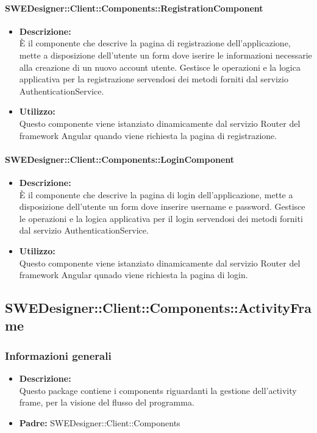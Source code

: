 			\paragraph{SWEDesigner::Client::Components::RegistrationComponent}
				\begin{itemize}
          			\item \textbf{Descrizione:}\\
          			È il componente che descrive la pagina di registrazione dell’applicazione, mette a disposizione dell’utente un form dove iserire le informazioni necessarie alla creazione di un nuovo account utente. Gestisce le operazioni e la logica applicativa per la registrazione servendosi dei metodi forniti dal servizio AuthenticationService.
          			\item \textbf{Utilizzo:}\\
          			Questo componente viene istanziato dinamicamente dal servizio Router del framework Angular quando viene richiesta la pagina di registrazione.
          		\end{itemize}
			\paragraph{SWEDesigner::Client::Components::LoginComponent}
				\begin{itemize}
          			\item \textbf{Descrizione:}\\
          			È il componente che descrive la pagina di login dell’applicazione, mette a disposizione dell’utente un form dove inserire username e password. Gestisce le operazioni e la logica applicativa per il login servendosi dei metodi forniti dal servizio AuthenticationService.
          			\item \textbf{Utilizzo:}\\
          			Questo componente viene istanziato dinamicamente dal servizio Router del framework Angular qunado viene richiesta la pagina di login.
          		\end{itemize}
	\subsection{SWEDesigner::Client::Components::ActivityFrame}
		\subsubsection{Informazioni generali}
			\begin{itemize}
          		\item \textbf{Descrizione:}\\
          		Questo package contiene i components riguardanti la gestione dell’activity frame, per la visione del flusso del programma.
          		\item \textbf{Padre:} SWEDesigner::Client::Components
          	\end{itemize}
